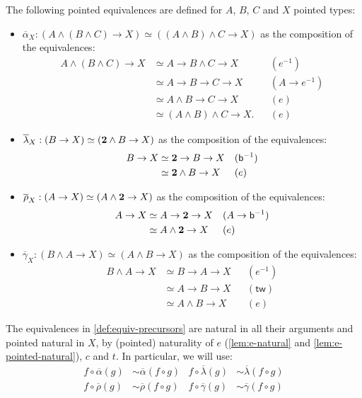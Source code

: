 \documentclass{article}
\newcommand{\smsh}{\wedge}
\renewcommand{\o}{\ensuremath{\circ}}
\newcommand{\sy}{^{-1}}
\newcommand{\alphabar}{\overline{\alpha}}
\newcommand{\rhobar}{\overline{\rho}}
\newcommand{\lambdabar}{\overline{\lambda}}
\newcommand{\gammabar}{\overline{\gamma}}
\newcommand{\two}{\mathsf{b}}
\newcommand{\twist}{\mathsf{tw}}
\begin{document}
\begin{defn}\label{def:equiv-precursors}
	The following pointed equivalences are defined for $A$, $B$, $C$ and $X$ pointed types:
	\begin{itemize}
		\item $\alphabar_X : (A \smsh (B \smsh C) \to X) \simeq ((A \smsh B) \smsh C \to X)$ as the composition of the equivalences:
			\begin{align*}
			    A \smsh (B \smsh C)\to X&\simeq A \to B\smsh C\to X && (e\sy)\\
			    &\simeq A \to B\to C\to X && (A \to e\sy)\\
			    &\simeq A \smsh B\to C\to X && (e)\\
		    	&\simeq (A \smsh B)\smsh C\to X. && (e)
			\end{align*}
		\item $\lambdabar_X : (B \to X) \simeq (\bool \smsh B \to X)$ as the composition of the equivalences:
			\begin{align*}
				B \to X &\simeq \bool \to B \to X && (\two\sy)\\
				&\simeq \bool \smsh B \to X && (e)
			\end{align*}
		\item $\rhobar_X : (A \to X) \simeq (A \smsh \bool \to X)$ as the composition of the equivalences:
			\begin{align*}
				A \to X &\simeq A \to \bool \to X && (A \to \two\sy)\\
				&\simeq A \smsh \bool \to X && (e)
			\end{align*}
		\item $\gammabar_X : (B \smsh A \to X) \simeq (A \smsh B \to X)$ as the composition of the equivalences:
			\begin{align*}
				B \smsh A \to X &\simeq B \to A \to X && (e\sy)\\
				&\simeq A \to B \to X && (\twist)\\
				&\simeq A \smsh B \to X && (e)
			\end{align*}
	\end{itemize}
\end{defn}

\begin{rmk}\label{rmk:alrg-pointed-natural}
	The equivalences in \autoref{def:equiv-precursors} are natural in all their arguments and pointed natural in $X$, by (pointed) naturality of $e$ (\autoref{lem:e-natural} and \autoref{lem:e-pointed-natural}), $c$ and $t$. In particular, we will use:
	\begin{align*}
	f \o \alphabar(g) &\sim \alphabar(f \o g) & f \o \lambdabar(g) &\sim \lambdabar(f \o g)\\
	f \o \rhobar(g) &\sim \rhobar(f \o g) & f \o \gammabar(g) &\sim \gammabar(f \o g)
	\end{align*}
\end{rmk}
\end{document}
